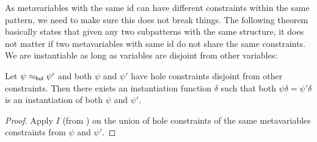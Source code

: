 \documentclass{mgr}
\begin{document}
As metavariables with the same id can have different constraints within the same pattern, we need to make sure this does not break things.
The following theorem basically states that given any two subpatterns with the same structure, it does not matter if two metavariables with same id do not share the same constraints.
We are instantiable as long as variables are disjoint from other variables:
\begin{lemma*}
  \label{prop:strong_trivial_inst}
  Let $\psi \approx_{\mathsf{hol}} \psi'$ and both $\psi$ and $\psi'$ have hole constraints disjoint from other constraints.
  Then there exists an instantiation function $\delta$ such that both $\psi \delta  = \psi' \delta$ is an instantiation of both $\psi$ and $\psi'$.
  \begin{proof}
    Apply $I$ (from ) on the union of hole constraints of the same metavariables constraints from $\psi$ and $\psi'$.
  \end{proof}
\end{lemma*}
\end{document}

